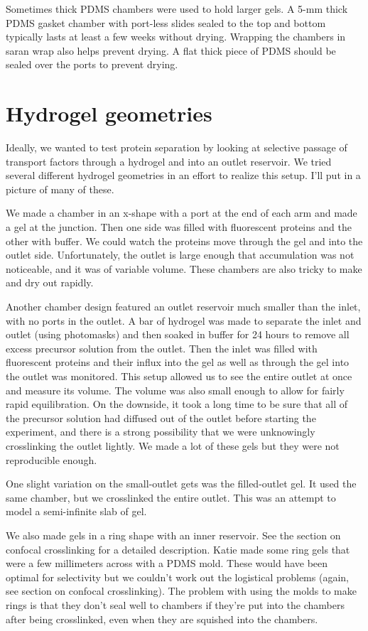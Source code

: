 Sometimes thick PDMS chambers were used to hold larger gels.  A 5-mm thick PDMS gasket chamber with port-less slides sealed to the top and bottom typically lasts at least a few weeks without drying.  Wrapping the chambers in saran wrap also helps prevent drying.  A flat thick piece of PDMS should be sealed over the ports to prevent drying.

\section{Hydrogel geometries}
Ideally, we wanted to test protein separation by looking at selective passage of transport factors through a hydrogel and into an outlet reservoir.  We tried several different hydrogel geometries in an effort to realize this setup.  I'll put in a picture of many of these.

We made a chamber in an x-shape with a port at the end of each arm and made a gel at the junction.  Then one side was filled with fluorescent proteins and the other with buffer.  We could watch the proteins move through the gel and into the outlet side.  Unfortunately, the outlet is large enough that accumulation was not noticeable, and it was of variable volume.  These chambers are also tricky to make and dry out rapidly.

Another chamber design featured an outlet reservoir much smaller than the inlet, with no ports in the outlet.  A bar of hydrogel was made to separate the inlet and outlet (using photomasks) and then soaked in buffer for 24 hours to remove all excess precursor solution from the outlet.  Then the inlet was filled with fluorescent proteins and their influx into the gel as well as through the gel into the outlet was monitored.  This setup allowed us to see the entire outlet at once and measure its volume.  The volume was also small enough to allow for fairly rapid equilibration.  On the downside, it took a long time to be sure that all of the precursor solution had diffused out of the outlet before starting the experiment, and there is a strong possibility that we were unknowingly crosslinking the outlet lightly.  We made a lot of these gels but they were not reproducible enough.

One slight variation on the small-outlet gets was the filled-outlet gel.  It used the same chamber, but we crosslinked the entire outlet.  This was an attempt to model a semi-infinite slab of gel.

We also made gels in a ring shape with an inner reservoir.  See the section on confocal crosslinking for a detailed description. Katie made some ring gels that were a few millimeters across with a PDMS mold.  These would have been optimal for selectivity but we couldn't work out the logistical problems (again, see section on confocal crosslinking).  The problem with using the molds to make rings is that they don't seal well to chambers if they're put into the chambers after being crosslinked, even when they are squished into the chambers.

